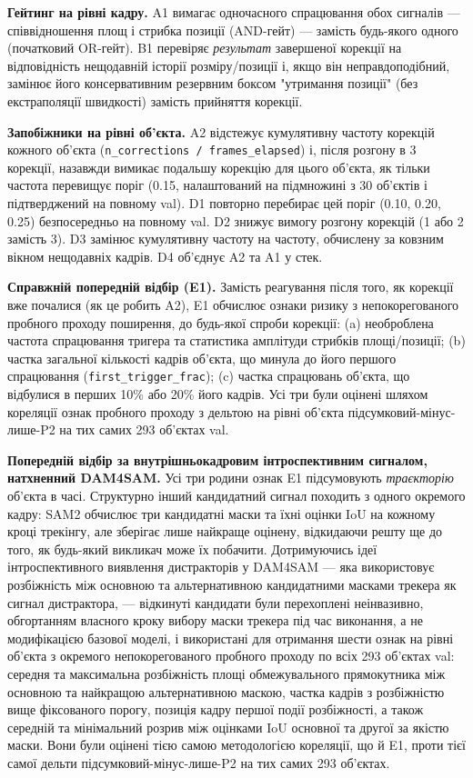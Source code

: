 \documentclass[11pt]{article}
\begin{document}
\textbf{Гейтинг на рівні кадру.} A1 вимагає одночасного спрацювання обох сигналів --- співвідношення площ і стрибка позиції (AND-гейт) --- замість будь-якого одного (початковий OR-гейт). B1 перевіряє \emph{результат} завершеної корекції на відповідність нещодавній історії розміру/позиції і, якщо він неправдоподібний, замінює його консервативним резервним боксом "утримання позиції" (без екстраполяції швидкості) замість прийняття корекції.

\textbf{Запобіжники на рівні об'єкта.} A2 відстежує кумулятивну частоту корекцій кожного об'єкта (\texttt{n\_corrections / frames\_elapsed}) і, після розгону в 3 корекції, назавжди вимикає подальшу корекцію для цього об'єкта, як тільки частота перевищує поріг (0.15, налаштований на підмножині з 30 об'єктів і підтверджений на повному val). D1 повторно перебирає цей поріг (0.10, 0.20, 0.25) безпосередньо на повному val. D2 знижує вимогу розгону корекцій (1 або 2 замість 3). D3 замінює кумулятивну частоту на частоту, обчислену за ковзним вікном нещодавніх кадрів. D4 об'єднує A2 та A1 у стек.

\textbf{Справжній попередній відбір (E1).} Замість реагування після того, як корекції вже почалися (як це робить A2), E1 обчислює ознаки ризику з непокорегованого пробного проходу поширення, до будь-якої спроби корекції: (a) необроблена частота спрацювання тригера та статистика амплітуди стрибків площі/позиції; (b) частка загальної кількості кадрів об'єкта, що минула до його першого спрацювання (\texttt{first\_trigger\_frac}); (c) частка спрацювань об'єкта, що відбулися в перших 10\% або 20\% його кадрів. Усі три були оцінені шляхом кореляції ознак пробного проходу з дельтою на рівні об'єкта підсумковий-мінус-лише-P2 на тих самих 293 об'єктах val.

\textbf{Попередній відбір за внутрішньокадровим інтроспективним сигналом, натхненний DAM4SAM.} Усі три родини ознак E1 підсумовують \emph{траєкторію} об'єкта в часі. Структурно інший кандидатний сигнал походить з одного окремого кадру: SAM2 обчислює три кандидатні маски та їхні оцінки IoU на кожному кроці трекінгу, але зберігає лише найкраще оцінену, відкидаючи решту ще до того, як будь-який викликач може їх побачити. Дотримуючись ідеї інтроспективного виявлення дистракторів у DAM4SAM \citep{videnovic2024} --- яка використовує розбіжність між основною та альтернативною кандидатними масками трекера як сигнал дистрактора, --- відкинуті кандидати були перехоплені неінвазивно, обгортанням власного кроку вибору маски трекера під час виконання, а не модифікацією базової моделі, і використані для отримання шести ознак на рівні об'єкта з окремого непокорегованого пробного проходу по всіх 293 об'єктах val: середня та максимальна розбіжність площі обмежувального прямокутника між основною та найкращою альтернативною маскою, частка кадрів з розбіжністю вище фіксованого порогу, позиція кадру першої події розбіжності, а також середній та мінімальний розрив між оцінками IoU основної та другої за якістю маски. Вони були оцінені тією самою методологією кореляції, що й E1, проти тієї самої дельти підсумковий-мінус-лише-P2 на тих самих 293 об'єктах.
\end{document}
